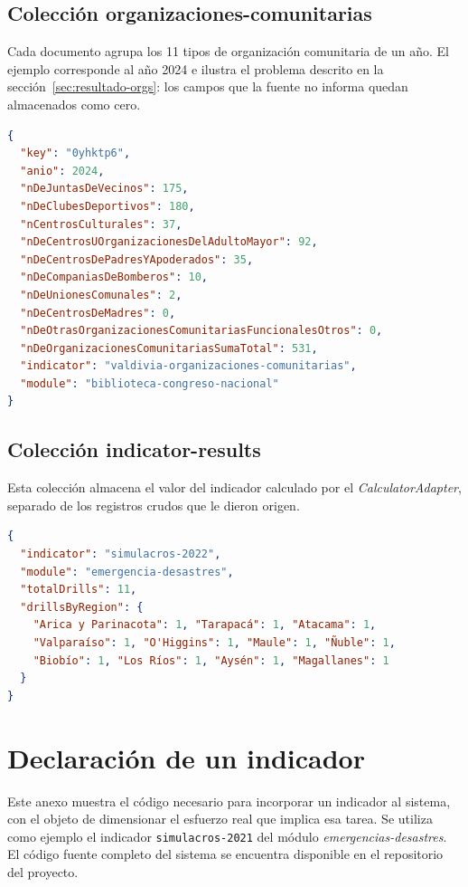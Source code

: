 \documentclass[12pt,letterpaper,oneside]{report}
\begin{document}
\section{Colecci\'on organizaciones-comunitarias}
\label{app:datos-orgs}

Cada documento agrupa los 11 tipos de organizaci\'on comunitaria de un a\~no. El ejemplo corresponde al a\~no 2024 e ilustra el problema descrito en la secci\'on~\ref{sec:resultado-orgs}: los campos que la fuente no informa quedan almacenados como cero.

\begin{lstlisting}[style=codigo, language=JSON]
{
  "key": "0yhktp6",
  "anio": 2024,
  "nDeJuntasDeVecinos": 175,
  "nDeClubesDeportivos": 180,
  "nCentrosCulturales": 37,
  "nDeCentrosUOrganizacionesDelAdultoMayor": 92,
  "nDeCentrosDePadresYApoderados": 35,
  "nDeCompaniasDeBomberos": 10,
  "nDeUnionesComunales": 2,
  "nDeCentrosDeMadres": 0,
  "nDeOtrasOrganizacionesComunitariasFuncionalesOtros": 0,
  "nDeOrganizacionesComunitariasSumaTotal": 531,
  "indicator": "valdivia-organizaciones-comunitarias",
  "module": "biblioteca-congreso-nacional"
}
\end{lstlisting}

\section{Colecci\'on indicator-results}
\label{app:datos-results}

Esta colecci\'on almacena el valor del indicador calculado por el \textit{CalculatorAdapter}, separado de los registros crudos que le dieron origen.

\begin{lstlisting}[style=codigo, language=JSON]
{
  "indicator": "simulacros-2022",
  "module": "emergencia-desastres",
  "totalDrills": 11,
  "drillsByRegion": {
    "Arica y Parinacota": 1, "Tarapacá": 1, "Atacama": 1,
    "Valparaíso": 1, "O'Higgins": 1, "Maule": 1, "Ñuble": 1,
    "Biobío": 1, "Los Ríos": 1, "Aysén": 1, "Magallanes": 1
  }
}
\end{lstlisting}


\chapter{Declaraci\'on de un indicador}
\label{app:codigo}

Este anexo muestra el c\'odigo necesario para incorporar un indicador al sistema, con el objeto de dimensionar el esfuerzo real que implica esa tarea. Se utiliza como ejemplo el indicador \texttt{simulacros-2021} del m\'odulo \textit{emergencias-desastres}. El c\'odigo fuente completo del sistema se encuentra disponible en el repositorio del proyecto.
\end{document}
